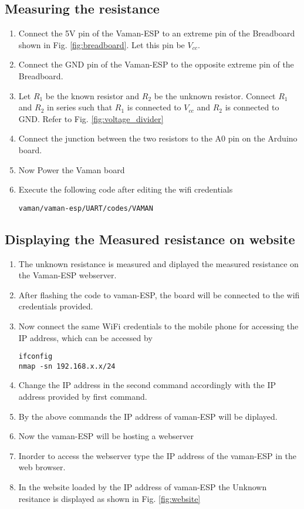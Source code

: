 \subsection{Measuring the resistance}
\begin{enumerate}[label=\thesection.\arabic*.,ref=\thesection.\theenumi]

\item
Connect the 5V pin of the Vaman-ESP to an extreme pin of the Breadboard shown in Fig. \ref{fig:breadboard}.  Let this pin be $V_{cc}$.
\item
Connect the GND pin of the Vaman-ESP to the opposite extreme pin of the Breadboard.

%
%
\item
Let $R_1$ be the known resistor and $R_2$ be the unknown resistor.  Connect $R_1$ and $R_2$ in series such that $R_1$ is connected
to $V_{cc}$ and $R_2$ is connected to GND. Refer to Fig. \ref{fig:voltage_divider}
\item
Connect the junction between the two resistors to  the A0 pin on the Arduino board.
\item
Now Power the Vaman board
\item
Execute the following code after editing the wifi credentials
\begin{lstlisting}
vaman/vaman-esp/UART/codes/VAMAN
\end{lstlisting}
\end{enumerate}
\subsection{Displaying the Measured resistance on website}
\begin{enumerate}[label=\thesection.\arabic*.,ref=\thesection.\theenumi]
\item The unknown resistance is measured and diplayed the measured resistance on the Vaman-ESP webserver.
\item After flashing the code to vaman-ESP, the board will be connected to the wifi credentials provided.
\item Now connect the same WiFi credentials to the mobile phone for accessing the IP address, which can be accessed by 
\begin{lstlisting}
ifconfig
nmap -sn 192.168.x.x/24
\end{lstlisting}
\item Change the IP address in the second command accordingly with the IP address provided by first command.
\item By the above commands the IP address of vaman-ESP will be diplayed.
\item Now the vaman-ESP will be hosting a webserver
\item Inorder to access the webserver type the IP address of the vaman-ESP in the web browser.
\item In the website loaded by the IP address of vaman-ESP the Unknown resitance is displayed as shown in Fig. \ref{fig:website}
\end{enumerate}
